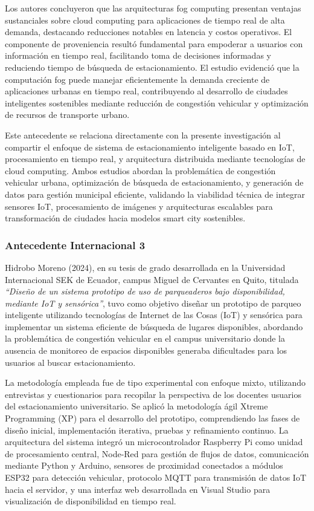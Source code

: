 \documentclass[12pt,a4paper]{article}
\begin{document}
Los autores concluyeron que las arquitecturas fog computing presentan ventajas sustanciales sobre cloud computing para aplicaciones de tiempo real de alta demanda, destacando reducciones notables en latencia y costos operativos. El componente de proveniencia resultó fundamental para empoderar a usuarios con información en tiempo real, facilitando toma de decisiones informadas y reduciendo tiempo de búsqueda de estacionamiento. El estudio evidenció que la computación fog puede manejar eficientemente la demanda creciente de aplicaciones urbanas en tiempo real, contribuyendo al desarrollo de ciudades inteligentes sostenibles mediante reducción de congestión vehicular y optimización de recursos de transporte urbano.

Este antecedente se relaciona directamente con la presente investigación al compartir el enfoque de sistema de estacionamiento inteligente basado en IoT, procesamiento en tiempo real, y arquitectura distribuida mediante tecnologías de cloud computing. Ambos estudios abordan la problemática de congestión vehicular urbana, optimización de búsqueda de estacionamiento, y generación de datos para gestión municipal eficiente, validando la viabilidad técnica de integrar sensores IoT, procesamiento de imágenes y arquitecturas escalables para transformación de ciudades hacia modelos smart city sostenibles.

\subsubsection{Antecedente Internacional 3}

Hidrobo Moreno (2024), en su tesis de grado desarrollada en la Universidad Internacional SEK de Ecuador, campus Miguel de Cervantes en Quito, titulada \textit{``Diseño de un sistema prototipo de uso de parqueaderos bajo disponibilidad, mediante IoT y sensórica''}, tuvo como objetivo diseñar un prototipo de parqueo inteligente utilizando tecnologías de Internet de las Cosas (IoT) y sensórica para implementar un sistema eficiente de búsqueda de lugares disponibles, abordando la problemática de congestión vehicular en el campus universitario donde la ausencia de monitoreo de espacios disponibles generaba dificultades para los usuarios al buscar estacionamiento.

La metodología empleada fue de tipo experimental con enfoque mixto, utilizando entrevistas y cuestionarios para recopilar la perspectiva de los docentes usuarios del estacionamiento universitario. Se aplicó la metodología ágil Xtreme Programming (XP) para el desarrollo del prototipo, comprendiendo las fases de diseño inicial, implementación iterativa, pruebas y refinamiento continuo. La arquitectura del sistema integró un microcontrolador Raspberry Pi como unidad de procesamiento central, Node-Red para gestión de flujos de datos, comunicación mediante Python y Arduino, sensores de proximidad conectados a módulos ESP32 para detección vehicular, protocolo MQTT para transmisión de datos IoT hacia el servidor, y una interfaz web desarrollada en Visual Studio para visualización de disponibilidad en tiempo real.
\end{document}
